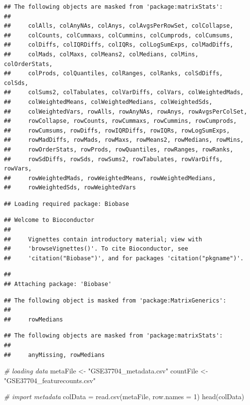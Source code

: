 \documentclass[
]{article}
\newenvironment{Shaded}{\begin{snugshade}}{\end{snugshade}}
\newcommand{\AttributeTok}[1]{\textcolor[rgb]{0.77,0.63,0.00}{#1}}
\newcommand{\CommentTok}[1]{\textcolor[rgb]{0.56,0.35,0.01}{\textit{#1}}}
\newcommand{\DecValTok}[1]{\textcolor[rgb]{0.00,0.00,0.81}{#1}}
\newcommand{\FunctionTok}[1]{\textcolor[rgb]{0.00,0.00,0.00}{#1}}
\newcommand{\NormalTok}[1]{#1}
\newcommand{\OtherTok}[1]{\textcolor[rgb]{0.56,0.35,0.01}{#1}}
\newcommand{\StringTok}[1]{\textcolor[rgb]{0.31,0.60,0.02}{#1}}
\begin{document}
\begin{verbatim}
## The following objects are masked from 'package:matrixStats':
## 
##     colAlls, colAnyNAs, colAnys, colAvgsPerRowSet, colCollapse,
##     colCounts, colCummaxs, colCummins, colCumprods, colCumsums,
##     colDiffs, colIQRDiffs, colIQRs, colLogSumExps, colMadDiffs,
##     colMads, colMaxs, colMeans2, colMedians, colMins, colOrderStats,
##     colProds, colQuantiles, colRanges, colRanks, colSdDiffs, colSds,
##     colSums2, colTabulates, colVarDiffs, colVars, colWeightedMads,
##     colWeightedMeans, colWeightedMedians, colWeightedSds,
##     colWeightedVars, rowAlls, rowAnyNAs, rowAnys, rowAvgsPerColSet,
##     rowCollapse, rowCounts, rowCummaxs, rowCummins, rowCumprods,
##     rowCumsums, rowDiffs, rowIQRDiffs, rowIQRs, rowLogSumExps,
##     rowMadDiffs, rowMads, rowMaxs, rowMeans2, rowMedians, rowMins,
##     rowOrderStats, rowProds, rowQuantiles, rowRanges, rowRanks,
##     rowSdDiffs, rowSds, rowSums2, rowTabulates, rowVarDiffs, rowVars,
##     rowWeightedMads, rowWeightedMeans, rowWeightedMedians,
##     rowWeightedSds, rowWeightedVars
\end{verbatim}

\begin{verbatim}
## Loading required package: Biobase
\end{verbatim}

\begin{verbatim}
## Welcome to Bioconductor
## 
##     Vignettes contain introductory material; view with
##     'browseVignettes()'. To cite Bioconductor, see
##     'citation("Biobase")', and for packages 'citation("pkgname")'.
\end{verbatim}

\begin{verbatim}
## 
## Attaching package: 'Biobase'
\end{verbatim}

\begin{verbatim}
## The following object is masked from 'package:MatrixGenerics':
## 
##     rowMedians
\end{verbatim}

\begin{verbatim}
## The following objects are masked from 'package:matrixStats':
## 
##     anyMissing, rowMedians
\end{verbatim}

\begin{Shaded}
\begin{Highlighting}[]
\CommentTok{\# loading data}
\NormalTok{metaFile }\OtherTok{\textless{}{-}} \StringTok{"GSE37704\_metadata.csv"}
\NormalTok{countFile }\OtherTok{\textless{}{-}} \StringTok{"GSE37704\_featurecounts.csv"}

\CommentTok{\# import metadata}
\NormalTok{colData }\OtherTok{=} \FunctionTok{read.csv}\NormalTok{(metaFile, }\AttributeTok{row.names =} \DecValTok{1}\NormalTok{)}
\FunctionTok{head}\NormalTok{(colData)}
\end{Highlighting}
\end{Shaded}
\end{document}
